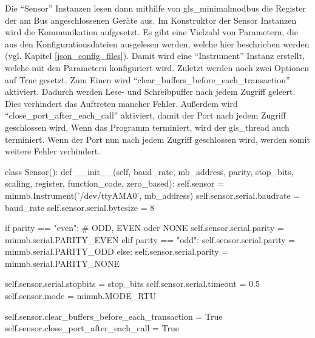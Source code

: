 Die \enquote{Sensor} Instanzen lesen dann mithilfe von \gls{gls_minimalmodbus} die Register der am Bus angeschlossenen Geräte aus. Im Konstruktor der Sensor Instanzen wird die Kommunikation aufgesetzt. Es gibt eine Vielzahl von Parametern, die aus den Konfigurationsdateien ausgelesen werden, welche hier beschrieben werden (vgl. Kapitel \ref{json_config_files}). Damit wird eine \enquote{Instrument} Instanz erstellt, welche mit den Parametern konfiguriert wird. Zuletzt werden noch zwei Optionen auf True gesetzt. Zum Einen wird \enquote{clear\_buffers\_before\_each\_transaction} aktiviert. Dadurch werden Lese- und Schreibpuffer nach jedem Zugriff geleert. Dies verhindert das Auftreten mancher Fehler. Außerdem wird \enquote{close\_port\_after\_each\_call} aktiviert, damit der Port nach jedem Zugriff geschlossen wird. Wenn das Programm terminiert, wird der \gls{gls_thread} auch terminiert. Wenn der Port nun nach jedem Zugriff geschlossen wird, werden somit weitere Fehler verhindert.

\begin{pythoncode}
class Sensor():
	def __init__(self, baud_rate, mb_address, parity, stop_bits, scaling, register, function_code, zero_based):
		self.sensor = minmb.Instrument('/dev/ttyAMA0', mb_address)
		self.sensor.serial.baudrate = baud_rate
		self.sensor.serial.bytesize = 8
		
		if parity == "even":  # ODD, EVEN oder NONE
			self.sensor.serial.parity = minmb.serial.PARITY_EVEN
		elif parity == "odd":
			self.sensor.serial.parity = minmb.serial.PARITY_ODD
		else:
			self.sensor.serial.parity = minmb.serial.PARITY_NONE
		
		self.sensor.serial.stopbits = stop_bits
		self.sensor.serial.timeout = 0.5
		self.sensor.mode = minmb.MODE_RTU
		
		self.sensor.clear_buffers_before_each_transaction = True
		self.sensor.close_port_after_each_call = True
\end{pythoncode}

